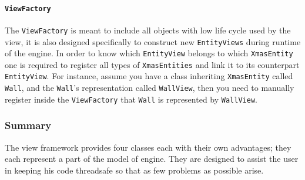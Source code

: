 \paragraph*{\texttt{ViewFactory}}

The \texttt{ViewFactory} is meant to include all objects with low
life cycle used by the view, it is also designed specifically to construct
new \texttt{EntityViews} during runtime of the engine. In order to
know which \texttt{EntityView} belongs to which \texttt{XmasEntity}
one is required to register all types of \texttt{XmasEntities} and
link it to its counterpart \texttt{EntityView}. For instance, assume
you have a class inheriting \texttt{XmasEntity} called \texttt{Wall},
and the \texttt{Wall}\textquoteright{}s representation called \texttt{WallView},
then you need to manually register inside the \texttt{ViewFactory}
that \texttt{Wall} is represented by \texttt{WallView}. 


\subsubsection*{Summary}

The view framework provides four classes each with their own advantages;
they each represent a part of the model of engine. They are designed
to assist the user in keeping his code threadsafe so that as few problems
as possible arise.
